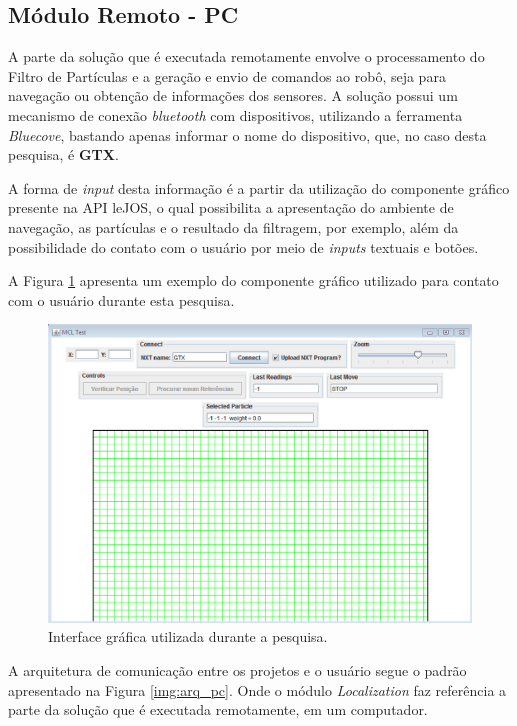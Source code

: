 	\subsection{Módulo Remoto - PC}

		A parte da solução que é executada remotamente envolve o processamento do Filtro de Partículas e a geração e envio de comandos ao robô, seja para navegação
		ou obtenção de informações dos sensores. A solução possui um mecanismo de conexão \textit{bluetooth} com dispositivos, utilizando a ferramenta
		\textit{Bluecove}, bastando apenas informar o nome do dispositivo, que, no caso desta pesquisa, é \textbf{GTX}.

		A forma de \textit{input} desta informação é a partir da utilização do componente gráfico presente na API leJOS, o qual possibilita a apresentação do ambiente de navegação,
		as partículas e o resultado da filtragem, por exemplo, além da possibilidade do contato com o usuário por meio de \textit{inputs} textuais e botões.

		A Figura \ref{img:frame_pc} apresenta um exemplo do componente gráfico utilizado para contato com o usuário durante esta pesquisa.

		\begin{figure}[H]
			\centering
			\includegraphics[scale=0.7]{figuras/frame.eps}
			\caption[Interface Gráfica]{Interface gráfica utilizada durante a pesquisa.}
			\label{img:frame_pc}
		\end{figure}

	A arquitetura de comunicação entre os projetos e o usuário segue o padrão apresentado na Figura \ref{img:arq_pc}. Onde o módulo \textit{Localization}
	faz referência a parte da solução que é executada remotamente, em um computador.

